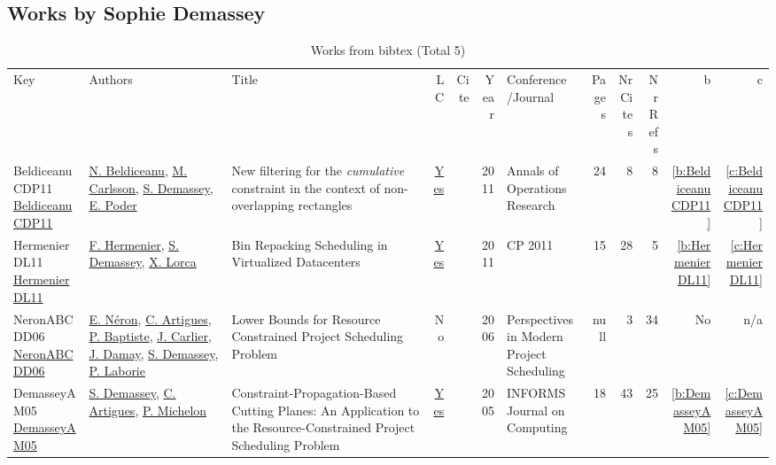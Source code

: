 \subsection{Works by Sophie Demassey}
\label{sec:a246}
{\scriptsize
\begin{longtable}{>{\raggedright\arraybackslash}p{3cm}>{\raggedright\arraybackslash}p{6cm}>{\raggedright\arraybackslash}p{6.5cm}rrrp{2.5cm}rrrrr}
\rowcolor{white}\caption{Works from bibtex (Total 5)}\\ \toprule
\rowcolor{white}Key & Authors & Title & LC & Cite & Year & \shortstack{Conference\\/Journal} & Pages & \shortstack{Nr\\Cites} & \shortstack{Nr\\Refs} & b & c \\ \midrule\endhead
\bottomrule
\endfoot
BeldiceanuCDP11 \href{https://doi.org/10.1007/s10479-010-0731-0}{BeldiceanuCDP11} & \hyperref[auth:a129]{N. Beldiceanu}, \hyperref[auth:a91]{M. Carlsson}, \hyperref[auth:a246]{S. Demassey}, \hyperref[auth:a364]{E. Poder} & New filtering for the \emph{cumulative} constraint in the context of non-overlapping rectangles & \href{works/BeldiceanuCDP11.pdf}{Yes} & \cite{BeldiceanuCDP11} & 2011 & Annals of Operations Research & 24 & 8 & 8 & \ref{b:BeldiceanuCDP11} & \ref{c:BeldiceanuCDP11}\\
HermenierDL11 \href{https://doi.org/10.1007/978-3-642-23786-7\_5}{HermenierDL11} & \hyperref[auth:a245]{F. Hermenier}, \hyperref[auth:a246]{S. Demassey}, \hyperref[auth:a247]{X. Lorca} & Bin Repacking Scheduling in Virtualized Datacenters & \href{works/HermenierDL11.pdf}{Yes} & \cite{HermenierDL11} & 2011 & CP 2011 & 15 & 28 & 5 & \ref{b:HermenierDL11} & \ref{c:HermenierDL11}\\
NeronABCDD06 \href{http://dx.doi.org/10.1007/978-0-387-33768-5_7}{NeronABCDD06} & \hyperref[auth:a917]{E. Néron}, \hyperref[auth:a6]{C. Artigues}, \hyperref[auth:a164]{P. Baptiste}, \hyperref[auth:a858]{J. Carlier}, \hyperref[auth:a918]{J. Damay}, \hyperref[auth:a246]{S. Demassey}, \hyperref[auth:a118]{P. Laborie} & Lower Bounds for Resource Constrained Project Scheduling Problem & No & \cite{NeronABCDD06} & 2006 & Perspectives in Modern Project Scheduling & null & 3 & 34 & No & n/a\\
DemasseyAM05 \href{http://dx.doi.org/10.1287/ijoc.1030.0043}{DemasseyAM05} & \hyperref[auth:a246]{S. Demassey}, \hyperref[auth:a6]{C. Artigues}, \hyperref[auth:a361]{P. Michelon} & Constraint-Propagation-Based Cutting Planes: An Application to the Resource-Constrained Project Scheduling Problem & \href{works/DemasseyAM05.pdf}{Yes} & \cite{DemasseyAM05} & 2005 & INFORMS Journal on Computing & 18 & 43 & 25 & \ref{b:DemasseyAM05} & \ref{c:DemasseyAM05}\\

\end{longtable}}
